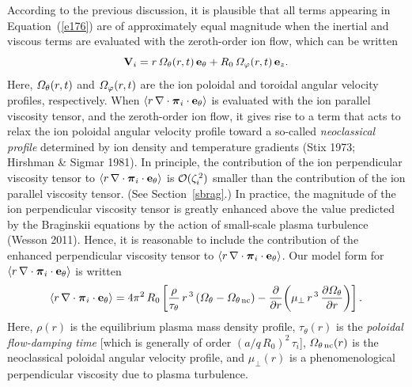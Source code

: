 \documentclass[notitlepage,12pt]{article}
\newcommand{\bpi}{\mbox{\boldmath$\pi$}}
\begin{document}
According to the previous discussion, it is plausible that all terms appearing in Equation~(\ref{e176}) are of approximately equal
magnitude when the inertial and viscous terms are evaluated with the zeroth-order ion flow, which can be written
\begin{equation}
{\bf V}_i = r\,{\mit\Omega}_\theta(r,t)\,{\bf e}_\theta + R_0\,{\mit\Omega}_\varphi(r,t)\,{\bf e}_z.
\end{equation}
Here, ${\mit\Omega}_\theta(r,t)$ and ${\mit\Omega}_\varphi(r,t)$ are the ion poloidal and toroidal angular velocity
profiles, respectively. When $\langle r\,\nabla\cdot \bpi_i\cdot{\bf e}_\theta\rangle$ is evaluated with  the ion parallel viscosity tensor, and the zeroth-order
ion flow, it gives rise to a term that acts to relax the ion poloidal angular velocity profile toward a so-called {\em neoclassical
profile}\/ determined by ion density and temperature gradients (Stix 1973; Hirshman \& Sigmar 1981). In principle, the
contribution of the ion perpendicular viscosity tensor to $\langle r\,\nabla\cdot \bpi_i\cdot{\bf e}_\theta\rangle$ 
is ${\cal O}(\zeta_i^{\,2})$ smaller than the contribution of the ion parallel viscosity tensor. (See Section~\ref{sbrag}.) In practice, the magnitude of the ion perpendicular
viscosity tensor is greatly enhanced above the value predicted by the Braginskii equations by the action of small-scale
plasma turbulence (Wesson 2011). Hence, it is reasonable to include the contribution of the enhanced perpendicular
viscosity tensor to $\langle r\,\nabla\cdot \bpi_i\cdot{\bf e}_\theta\rangle$. Our model form for $\langle r\,\nabla\cdot \bpi_i\cdot{\bf e}_\theta\rangle$ is written
\begin{equation}\label{e178}
\langle r\,\nabla\cdot \bpi_i\cdot{\bf e}_\theta\rangle = 4\pi^2\,R_0\left[ \frac{\rho}{\tau_\theta}\,r^{\,3}\,({\mit\Omega}_\theta-{\mit\Omega}_{\theta\,{\rm nc}}) -\frac{\partial}{\partial r}\!\left(\mu_\perp\,r^{\,3}\,\frac{\partial{\mit\Omega}_\theta}{\partial r}\right)\right].
\end{equation}
Here, $\rho(r)$ is the equilibrium plasma mass density profile, $\tau_\theta(r)$ is the {\em poloidal flow-damping time}\/ [which
is generally of order $(a/q\,R_0)^2\,\tau_i$], ${\mit\Omega}_{\theta\,{\rm nc}}(r)$ is the neoclassical poloidal angular velocity profile, and
$\mu_\perp(r)$ is a phenomenological perpendicular viscosity due to plasma turbulence. 
\end{document}
